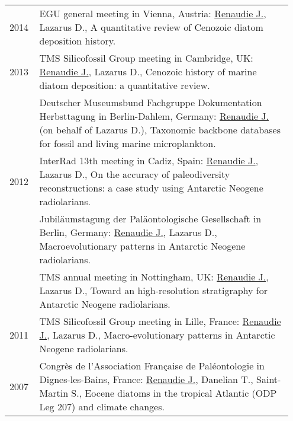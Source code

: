 \documentclass[11pt, a4paper]{article}
\begin{document}
\begin{longtable}{@{}p{0.1\linewidth} P{0.85\linewidth}@{}}
2014 & EGU general meeting in Vienna, Austria: \underline{Renaudie J.}, Lazarus D., A quantitative review of Cenozoic diatom deposition history.\\
2013 & TMS Silicofossil Group meeting in Cambridge, UK: \underline{Renaudie J.}, Lazarus D., Cenozoic history of marine diatom deposition: a quantitative review.\\
 & Deutscher Museumsbund Fachgruppe Dokumentation Herbsttagung in Berlin-Dahlem, Germany: \underline{Renaudie J.} (on behalf of Lazarus D.), Taxonomic backbone databases for fossil and living marine microplankton.\\
2012 & InterRad 13th meeting in Cadiz, Spain: \underline{Renaudie J.}, Lazarus D., On the accuracy of paleodiversity reconstructions: a case study using Antarctic Neogene radiolarians.\\
 & Jubil\"{a}umstagung der Pal\"{a}ontologische Gesellschaft in Berlin, Germany: \underline{Renaudie J.}, Lazarus D., Macroevolutionary patterns in Antarctic Neogene radiolarians.\\
 & TMS annual meeting in Nottingham, UK: \underline{Renaudie J.}, Lazarus D., Toward an high-resolution stratigraphy for Antarctic Neogene radiolarians.\\
2011 & TMS Silicofossil Group meeting in Lille, France: \underline{Renaudie J.}, Lazarus D., Macro-evolutionary patterns in Antarctic Neogene radiolarians.\\
2007 & Congr\`{e}s de l'Association Fran\c{c}aise de Pal\'{e}ontologie in Dignes-les-Bains, France: \underline{Renaudie J.}, Danelian T., Saint-Martin S., Eocene diatoms in the tropical Atlantic (ODP Leg 207) and climate changes.\\
\end{longtable}
\end{document}
